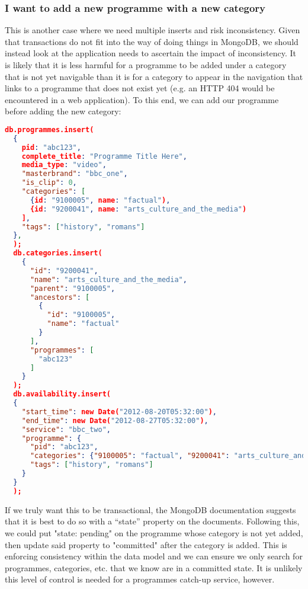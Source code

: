\documentclass[11pt,a4paper]{article}
\begin{document}
\subsubsection{I want to add a new programme with a new category}

This is another case where we need multiple inserts and risk inconsistency.
Given that transactions do not fit into the way of doing things in MongoDB,
we should instead look at the application needs to ascertain the impact
of inconsistency. It is likely that it is less harmful for a programme to be
added under a category that is not yet navigable than it is for a category
to appear in the navigation that links to a programme that does not exist yet
(e.g. an HTTP 404 would be encountered in a web application). To this
end, we can add our programme before adding the new category:

\begin{lstlisting}[language=json]
  db.programmes.insert(
  {
    pid: "abc123",
    complete_title: "Programme Title Here",
    media_type: "video",
    "masterbrand": "bbc_one",
    "is_clip": 0,
    "categories": [
      {id: "9100005", name: "factual"),
      {id: "9200041", name: "arts_culture_and_the_media")
    ],
    "tags": ["history", "romans"]
  },
  );
  db.categories.insert(
    {
      "id": "9200041",
      "name": "arts_culture_and_the_media",
      "parent": "9100005",
      "ancestors": [
        {
          "id": "9100005",
          "name": "factual"
        }
      ],
      "programmes": [
        "abc123"
      ]
    }
  );
  db.availability.insert(
  {
    "start_time": new Date("2012-08-20T05:32:00"),
    "end_time": new Date("2012-08-27T05:32:00"),
    "service": "bbc_two",
    "programme": {
      "pid": "abc123",
      "categories": {"9100005": "factual", "9200041": "arts_culture_and_the_media"},
      "tags": ["history", "romans"]
    }
  }
  );
\end{lstlisting}

If we truly want this to be transactional, the MongoDB
documentation suggests \cite{mongo-two-phase-commits} that it
is best to do so with a ``state'' property on the documents.
Following this, we could put "state: pending" on the programme
whose category is not yet added, then update said property
to "committed" after the category is added. This is enforcing
consistency within the data model and we can ensure we only
search for programmes, categories, etc. that we know are in
a committed state. It is unlikely this level of control is needed
for a programmes catch-up service, however.
\end{document}
